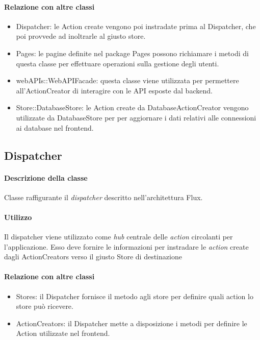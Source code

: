 \paragraph*{Relazione con altre classi}
\begin{itemize}
\item Dispatcher: le Action create vengono poi instradate prima al Dispatcher, che poi provvede ad inoltrarle al giusto store.
\item Pages: le pagine definite nel package Pages possono richiamare i metodi di questa classe per effettuare operazioni sulla gestione degli utenti.
\item webAPIs::WebAPIFacade: questa classe viene utilizzata per permettere all'ActionCreator di interagire con le API esposte dal backend.
\item Store::DatabaseStore: le Action create da DatabaseActionCreator vengono utilizzate da DatabaseStore per per aggiornare i dati relativi alle connessioni ai database nel frontend.
\end{itemize}

\subsection{Dispatcher}
\paragraph*{Descrizione della classe}
Classe raffigurante il \textit{dispatcher} descritto nell'architettura Flux.
\paragraph*{Utilizzo}
Il dispatcher viene utilizzato come \textit{hub} centrale delle \textit{action} circolanti per l'applicazione. Esso deve fornire le informazioni per instradare le \textit{action} create dagli ActionCreators verso il giusto Store di destinazione
\paragraph*{Relazione con altre classi}
\begin{itemize}
\item Stores: il Dispatcher fornisce il metodo agli store per definire quali action lo store può ricevere.
\item ActionCreators: il Dispatcher mette a disposizione i metodi per definire le Action utilizzate nel frontend.
\end{itemize}


